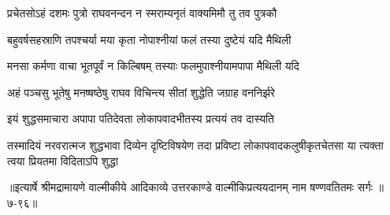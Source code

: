 \twolineshloka
{प्रचेतसोऽहं दशमः पुत्रो राघवनन्दन}
{न स्मराम्यनृतं वाक्यमिमौ तु तव पुत्रकौ} %

\twolineshloka
{बहुवर्षसहस्राणि तपश्चर्या मया कृता}
{नोपाश्नीयां फलं तस्या दुष्टेयं यदि मैथिली} %

\twolineshloka
{मनसा कर्मणा वाचा भूतपूर्वं न किल्बिषम्}
{तस्याः फलमुपाश्नीयामपापा मैथिली यदि} %

\twolineshloka
{अहं पञ्चसु भूतेषु मनष्षष्ठेषु राघव}
{विचिन्त्य सीतां शुद्धेति जग्राह वननिर्झरे} %

\twolineshloka
{इयं शुद्धसमाचारा अपापा पतिदेवता}
{लोकापवादभीतस्य प्रत्ययं तव दास्यति} %

\twolineshloka
{तस्मादियं नरवरात्मज शुद्धभावा दिव्येन दृष्टिविषयेण तदा प्रविष्टा}
{लोकापवादकलुषीकृतचेतसा या त्यक्ता त्वया प्रियतमा विदिताऽपि शुद्धा} %


॥इत्यार्षे श्रीमद्रामायणे वाल्मीकीये आदिकाव्ये उत्तरकाण्डे वाल्मीकिप्रत्ययदानम् नाम षण्णवतितमः सर्गः ॥७-९६॥
